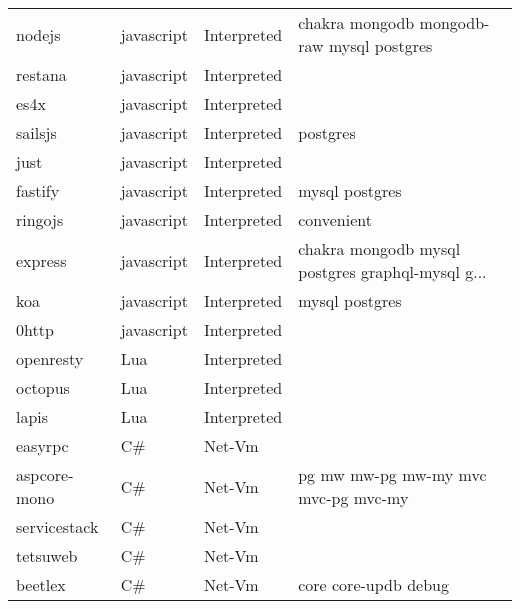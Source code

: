 \begin{longtable}{llll}
    nodejs           & javascript  & Interpreted & chakra mongodb mongodb-raw mysql postgres          \\
    restana          & javascript  & Interpreted &                                                    \\
    es4x             & javascript  & Interpreted &                                                    \\
    sailsjs          & javascript  & Interpreted & postgres                                           \\
    just             & javascript  & Interpreted &                                                    \\
    fastify          & javascript  & Interpreted & mysql postgres                                     \\
    ringojs          & javascript  & Interpreted & convenient                                         \\
    express          & javascript  & Interpreted & chakra mongodb mysql postgres graphql-mysql g...   \\
    koa              & javascript  & Interpreted & mysql postgres                                     \\
    0http            & javascript  & Interpreted &                                                    \\
    openresty        & Lua         & Interpreted &                                                    \\
    octopus          & Lua         & Interpreted &                                                    \\
    lapis            & Lua         & Interpreted &                                                    \\
    easyrpc          & C\#         & Net-Vm      &                                                    \\
    aspcore-mono     & C\#         & Net-Vm      & pg mw mw-pg mw-my mvc mvc-pg mvc-my                \\
    servicestack     & C\#         & Net-Vm      &                                                    \\
    tetsuweb         & C\#         & Net-Vm      &                                                    \\
    beetlex          & C\#         & Net-Vm      & core core-updb debug                               \\

\end{longtable}
